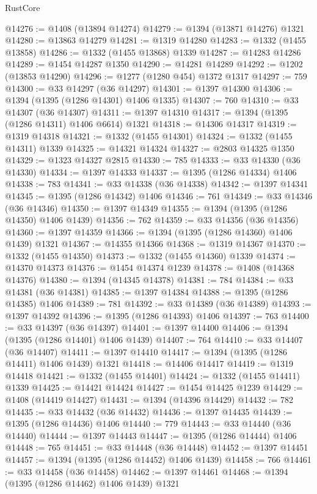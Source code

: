 \begin{lexlean}{RustCore}
\begin{coremodule}
@14276 := @1408 (@13894 @14274)
@14279 := @1394 (@13871 @14276) @1321
@14280 := @13863 @14279
@14281 := @1319 @14280
@14283 := @1332 (@1455 @13858)
@14286 := @1332 (@1455 @13868) @1339
@14287 := @14283 @14286
@14289 := @1454 @14287 @1350
@14290 := @14281 @14289
@14292 := @1202 (@13853 @14290)
@14296 := @1277 (@1280 @454) @1372 @1317
@14297 := 759
@14300 := @33 @14297 (@36 @14297)
@14301 := @1397 @14300
@14306 := @1394 (@1395 (@1286 @14301) @1406 @1335)
@14307 := 760
@14310 := @33 @14307 (@36 @14307)
@14311 := @1397 @14310
@14317 := @1394 (@1395 (@1286 @14311) @1406 @6614) @1321
@14318 := @14306 @14317
@14319 := @1319 @14318
@14321 := @1332 (@1455 @14301)
@14324 := @1332 (@1455 @14311) @1339
@14325 := @14321 @14324
@14327 := @2803 @14325 @1350
@14329 := @1323 @14327 @2815
@14330 := 785
@14333 := @33 @14330 (@36 @14330)
@14334 := @1397 @14333
@14337 := @1395 (@1286 @14334) @1406
@14338 := 783
@14341 := @33 @14338 (@36 @14338)
@14342 := @1397 @14341
@14345 := @1395 (@1286 @14342) @1406
@14346 := 761
@14349 := @33 @14346 (@36 @14346)
@14350 := @1397 @14349
@14355 := @1394 (@1395 (@1286 @14350) @1406 @1439)
@14356 := 762
@14359 := @33 @14356 (@36 @14356)
@14360 := @1397 @14359
@14366 := @1394 (@1395 (@1286 @14360) @1406 @1439) @1321
@14367 := @14355 @14366
@14368 := @1319 @14367
@14370 := @1332 (@1455 @14350)
@14373 := @1332 (@1455 @14360) @1339
@14374 := @14370 @14373
@14376 := @1454 @14374 @1239
@14378 := @1408 (@14368 @14376)
@14380 := @1394 (@14345 @14378)
@14381 := 784
@14384 := @33 @14381 (@36 @14381)
@14385 := @1397 @14384
@14388 := @1395 (@1286 @14385) @1406
@14389 := 781
@14392 := @33 @14389 (@36 @14389)
@14393 := @1397 @14392
@14396 := @1395 (@1286 @14393) @1406
@14397 := 763
@14400 := @33 @14397 (@36 @14397)
@14401 := @1397 @14400
@14406 := @1394 (@1395 (@1286 @14401) @1406 @1439)
@14407 := 764
@14410 := @33 @14407 (@36 @14407)
@14411 := @1397 @14410
@14417 := @1394 (@1395 (@1286 @14411) @1406 @1439) @1321
@14418 := @14406 @14417
@14419 := @1319 @14418
@14421 := @1332 (@1455 @14401)
@14424 := @1332 (@1455 @14411) @1339
@14425 := @14421 @14424
@14427 := @1454 @14425 @1239
@14429 := @1408 (@14419 @14427)
@14431 := @1394 (@14396 @14429)
@14432 := 782
@14435 := @33 @14432 (@36 @14432)
@14436 := @1397 @14435
@14439 := @1395 (@1286 @14436) @1406
@14440 := 779
@14443 := @33 @14440 (@36 @14440)
@14444 := @1397 @14443
@14447 := @1395 (@1286 @14444) @1406
@14448 := 765
@14451 := @33 @14448 (@36 @14448)
@14452 := @1397 @14451
@14457 := @1394 (@1395 (@1286 @14452) @1406 @1439)
@14458 := 766
@14461 := @33 @14458 (@36 @14458)
@14462 := @1397 @14461
@14468 := @1394 (@1395 (@1286 @14462) @1406 @1439) @1321

\end{coremodule}
\end{lexlean}
